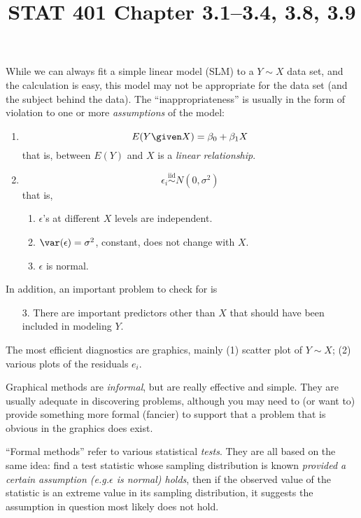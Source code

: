\documentclass[12pt]{article}
\begin{document}
\title{STAT 401 Chapter 3.1--3.4, 3.8, 3.9}
\maketitle

While we can always fit a simple linear model (SLM) to a
$Y \sim X$ data set, and the calculation is easy,
this model may not be appropriate for the data set
(and the subject behind the data).
The ``inappropriateness'' is usually in the form of violation  to
one or more \emph{assumptions} of the model:
\begin{enumerate}
\item \[E(Y \given X) = \beta_0 + \beta_1 X\]
    that is, between $E(Y)$ and $X$ is a \emph{linear relationship}.
\item \[ \epsilon_i \overset{\text{iid}}{\sim} N(0, \sigma^2) \]
    that is,
    \begin{enumerate}
        \item $\epsilon$'s at different $X$ levels are independent.
        \item $\var(\epsilon) = \sigma^2$, constant, does not change
            with $X$.
        \item $\epsilon$ is normal.
    \end{enumerate}
\end{enumerate}
In addition, an important problem to check for is
\begin{enumerate}
\item[3.] There are important predictors other than $X$ that should have
been included in modeling $Y$.
\end{enumerate}

\bigskip

The most efficient diagnostics are graphics, mainly (1) scatter plot of
$Y \sim X$; (2) various plots of the residuals $e_i$.

Graphical methods are \emph{informal}, but are really effective and
simple.
They are usually adequate in discovering problems,
although you may need to (or want to) provide something more formal
(fancier) to support that a problem that is obvious in the graphics
does exist.

``Formal methods'' refer to various statistical \emph{tests}.
They are all based on the same idea:
find a test statistic whose sampling distribution is known
\emph{provided a certain assumption (e.g.\@ $\epsilon$ is normal) holds},
then if the observed value of the statistic is an extreme value
in its sampling distribution, it suggests the assumption in question
most likely does not hold.
\end{document}
